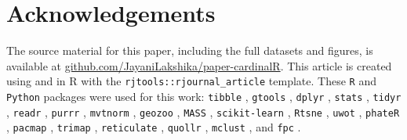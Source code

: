\section{Acknowledgements}\label{acknowledgements}

The source material for this paper, including the full datasets and figures, is available at \href{https://github.com/JayaniLakshika/paper-cardinalR}{github.com/JayaniLakshika/paper-cardinalR}. This article is created using  \citep{yihui2015} and  \citep{yihui2018} in R with the \texttt{rjtools::rjournal\_article} template. These \texttt{R} and \texttt{Python} packages were used for this work: \texttt{tibble} \citep{kirill2023}, \texttt{gtools} \citep{gregory2023}, \texttt{dplyr} \citep{hadley2023}, \texttt{stats} \citep{core2025}, \texttt{tidyr} \citep{hadley2024}, \texttt{readr} \citep{hadley2025b}, \texttt{purrr} \citep{hadley2025}, \texttt{mvtnorm} \citep{alan2009}, \texttt{geozoo} \citep{barret2016}, \texttt{MASS} \citep{venables2002}, \texttt{scikit-learn} \citep{pedregosa2011}, \texttt{Rtsne} \citep{jesse2015}, \texttt{uwot} \citep{james2025b}, \texttt{phateR} \citep{moon2019}, \texttt{pacmap} \citep{wang2021}, \texttt{trimap} \citep{amid2021}, \texttt{reticulate} \citep{kevin2025}, \texttt{quollr} \citep{jayani2025}, \texttt{mclust} \citep{luca2023}, and \texttt{fpc} \citep{christian2024}.



\address{%
Jayani P. Gamage\\
Monash University\\%
Department of Econometrics and Business Statistics, VIC 3800 Australia\\
%
\url{https://jayanilakshika.netlify.app/}\\%
\textit{ORCiD: \href{https://orcid.org/0000-0002-6265-6481}{0000-0002-6265-6481}}\\%
\href{mailto:jayani.piyadigamage@monash.edu}{\nolinkurl{jayani.piyadigamage@monash.edu}}%
}

\address{%
Dianne Cook\\
Monash University\\%
Department of Econometrics and Business Statistics, VIC 3800 Australia\\
%
\url{http://www.dicook.org/}\\%
\textit{ORCiD: \href{https://orcid.org/0000-0002-3813-7155}{0000-0002-3813-7155}}\\%
\href{mailto:dicook@monash.edu}{\nolinkurl{dicook@monash.edu}}%
}

